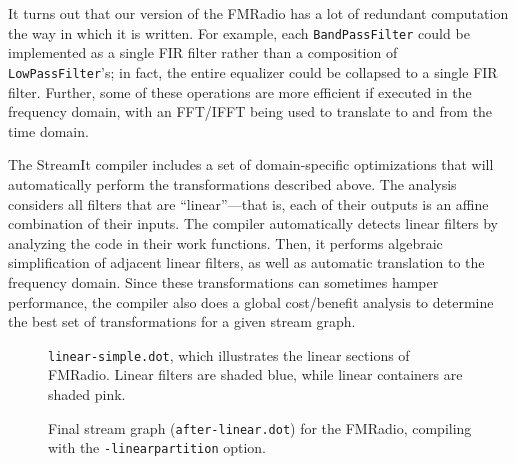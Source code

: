   It turns out that our
version of the FMRadio has a lot of redundant computation the way in
which it is written.  For example, each {\tt BandPassFilter} could be
implemented as a single FIR filter rather than a composition of {\tt
LowPassFilter}'s; in fact, the entire equalizer could be collapsed to
a single FIR filter.  Further, some of these operations are more
efficient if executed in the frequency domain, with an FFT/IFFT being
used to translate to and from the time domain.

The StreamIt compiler includes a set of domain-specific optimizations
that will automatically perform the transformations described above.
The analysis considers all filters that are ``linear''---that is, each
of their outputs is an affine combination of their inputs.  The
compiler automatically detects linear filters by analyzing the code in
their work functions.  Then, it performs algebraic simplification of
adjacent linear filters, as well as automatic translation to the
frequency domain.  Since these transformations can sometimes hamper
performance, the compiler also does a global cost/benefit analysis to
determine the best set of transformations for a given stream graph.

\begin{figure}[t]
\hspace{3pt} 
\caption{{\tt linear-simple.dot}, which illustrates the linear sections of FMRadio.  Linear filters are shaded blue, while linear containers are shaded pink.\protect\label{fig:fm-linear-simple}}
\end{figure}

\begin{figure}[t]
\vspace{-6pt}
\begin{center}
\mbox{}
\vspace{-6pt}
\caption{Final stream graph ({\tt after-linear.dot}) for the FMRadio, compiling with the {\tt -linearpartition} option.\protect\label{fig:fm-after-linear}}
\end{center}
\vspace{-14pt}
\end{figure}


